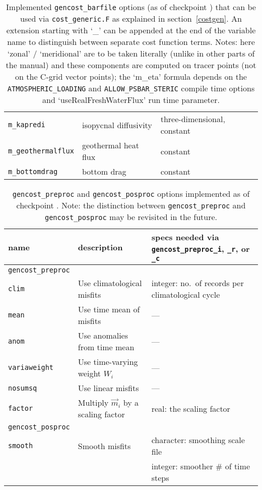 \begin{table}[!ht]
\begin{tabular}{lll}
\texttt{m\_kapredi}			&	isopycnal diffusivity			& three-dimensional, constant \\ 
\texttt{m\_geothermalflux}		&	geothermal heat flux			& constant \\ 
\texttt{m\_bottomdrag}		&	bottom drag				& constant \\
\end{tabular}
\caption{Implemented \texttt{gencost\_barfile} options (as of checkpoint \mitgcmCheckpointVersion) that can be used via \texttt{cost\_generic.F} as explained in section~\ref{costgen}. An extension starting with `\_' can be appended at the end of the variable name to distinguish between separate cost function terms. Notes: here `zonal' / `meridional' are to be taken literally (unlike in other parts of the manual) and these components are computed on tracer points (not on the C-grid vector points); the `m\_eta' formula depends on the \texttt{ATMOSPHERIC\_LOADING} and \texttt{ALLOW\_PSBAR\_STERIC} compile time options and `useRealFreshWaterFlux' run time parameter.}
\label{tbl:gencost_ecco_barfile}
\end{table}

\begin{table}[!ht]
\centering
\begin{tabular}{lll}
name					&	description					&	specs needed via \texttt{gencost\_preproc\_i}, \texttt{\_r}, or \texttt{\_c} \\ \hline\hline
\texttt{gencost\_preproc} \\ \hline
\texttt{clim} 				&	Use climatological misfits	&	integer: no.\ of records per climatological cycle \\
\texttt{mean} 				&	Use time mean of misfits 	&	--- \\
\texttt{anom} 				&	Use anomalies from time mean &	--- \\
\texttt{variaweight}		&	Use time-varying weight $W_i$&	--- \\
\texttt{nosumsq} 			&	Use linear misfits 			&	--- \\
\texttt{factor} 			&	Multiply $\vec{m}_i$ by a scaling factor	&	real: the scaling factor \\ \hline \hline
\texttt{gencost\_posproc} \\ \hline
\texttt{smooth} 			&	Smooth misfits				&	character: smoothing scale file\\ 
						&								&	integer: smoother \# of time steps \\
\end{tabular} 
\caption{\texttt{gencost\_preproc} and \texttt{gencost\_posproc} options implemented as of checkpoint \mitgcmCheckpointVersion. Note: the distinction between \texttt{gencost\_preproc} and \texttt{gencost\_posproc} may be revisited in the future.}
\label{tbl:gencost_ecco_preproc}
\end{table}

